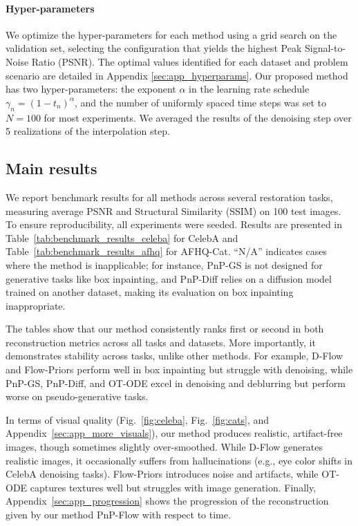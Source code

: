\documentclass{article} %
\theoremstyle{definition}
\begin{document}
\paragraph{Hyper-parameters}
We optimize the hyper-parameters for each method using a grid search on the validation set, selecting the configuration that yields the highest Peak Signal-to-Noise Ratio (PSNR). The optimal values identified for each dataset and problem scenario are detailed in Appendix \ref{sec:app_hyperparams}. Our proposed method has two hyper-parameters: the exponent $\alpha$ in the learning rate schedule $\gamma_n = (1-t_n)^{\alpha}$, and the number of uniformly spaced time steps was set to $N = 100$ for most experiments. We averaged the results of the denoising step over 5 realizations of the interpolation step.

\subsection{Main results}\label{subsec:main_results}
We report benchmark results for all methods across several restoration tasks, measuring average PSNR and Structural Similarity (SSIM) on 100 test images. To ensure reproducibility, all experiments were seeded. Results are presented in Table~\ref{tab:benchmark_results_celeba} for CelebA and Table~\ref{tab:benchmark_results_afhq} for AFHQ-Cat. ``N/A'' indicates cases where the method is inapplicable; for instance, PnP-GS \citep{hurault2022gradient} is not designed for generative tasks like box inpainting, and PnP-Diff relies on a diffusion model trained on another dataset, making its evaluation on box inpainting inappropriate. 

The tables show that our method consistently ranks first or second in both reconstruction metrics across all tasks and datasets. More importantly, it demonstrates stability across tasks, unlike other methods. For example, D-Flow and Flow-Priors perform well in box inpainting but struggle with denoising, while PnP-GS, PnP-Diff, and OT-ODE excel in denoising and deblurring but perform worse on pseudo-generative tasks.

In terms of visual quality (Fig.~\ref{fig:celeba}, Fig.~\ref{fig:cats}, and Appendix~\ref{sec:app_more_visuals}), our method produces realistic, artifact-free images, though sometimes slightly over-smoothed. While D-Flow generates realistic images, it occasionally suffers from hallucinations (e.g., eye color shifts in CelebA denoising tasks). Flow-Priors introduces noise and artifacts, while OT-ODE captures textures well but struggles with image generation. Finally, Appendix~\ref{sec:app_progression} shows the progression of the reconstruction given by our method PnP-Flow with respect to time.
\end{document}
